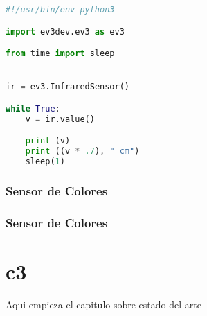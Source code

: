 \documentclass{beamer}
\begin{document}
\newpage
\begin{small}
\begin{lstlisting}[language=Python]
#!/usr/bin/env python3

import ev3dev.ev3 as ev3

from time import sleep


ir = ev3.InfraredSensor()

while True:
	v = ir.value()

	print (v)
	print ((v * .7), " cm")
	sleep(1)
\end{lstlisting}
\end{small}

\newpage
\subsubsection{Sensor de Colores}
\begin{frame}\frametitle{Sensor de Colores}

\end{frame}

\newpage
\section{c3}
Aqui empieza el capitulo sobre estado del arte
\end{document}
